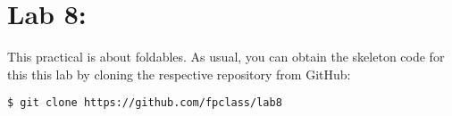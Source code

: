 \section{Lab 8: \practicalSevenTitle}

This practical is about foldables. As usual, you can obtain the skeleton code for this this lab by cloning the respective repository from GitHub:
\begin{verbatim}
$ git clone https://github.com/fpclass/lab8
\end{verbatim}